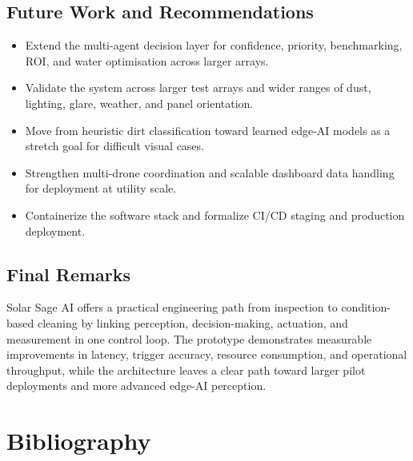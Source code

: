 \documentclass[12pt]{report}
\begin{document}
\section{Future Work and Recommendations}

\begin{itemize}[leftmargin=*]
    \item Extend the multi-agent decision layer for confidence, priority, benchmarking, ROI, and water optimisation across larger arrays.
    \item Validate the system across larger test arrays and wider ranges of dust, lighting, glare, weather, and panel orientation.
    \item Move from heuristic dirt classification toward learned edge-AI models as a stretch goal for difficult visual cases.
    \item Strengthen multi-drone coordination and scalable dashboard data handling for deployment at utility scale.
    \item Containerize the software stack and formalize CI/CD staging and production deployment.
\end{itemize}

\section{Final Remarks}

Solar Sage AI offers a practical engineering path from inspection to condition-based cleaning by linking perception, decision-making, actuation, and measurement in one control loop. The prototype demonstrates measurable improvements in latency, trigger accuracy, resource consumption, and operational throughput, while the architecture leaves a clear path toward larger pilot deployments and more advanced edge-AI perception.

\chapter*{Bibliography}

\end{document}
